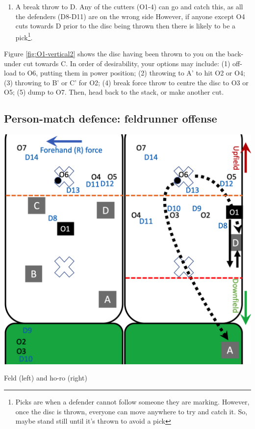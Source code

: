 \documentclass{tufte-handout}
\begin{document}
\begin{enumerate}
\item A break throw to D. 
Any of the cutters 
(O1-4)
can go and catch this, 
as all the defenders 
(D8-D11) 
are on the wrong side
However,
if anyone 
except O4 
cuts towards D 
prior to the disc being thrown 
then there is likely 
to be a pick\footnote{
Picks are
when a defender 
cannot follow 
someone they are marking.  
However, 
once the disc is thrown,
everyone can move anywhere 
to try and catch it. 
So, maybe stand still 
until it's thrown 
to avoid a pick}.
\end{enumerate}

Figure \ref{fig:O1-vertical2} shows 
the disc having been thrown to you
on the back-under cut towards C. 
In order of desirability, 
your options may include: 
(1)
off-load to O6, 
putting them in power position;
(2) throwing to A' to hit O2 or O4;
(3) throwing to B' or C' for O2;
(4) break force throw 
to centre the disc
to O3 or O5;
(5) dump to O7.
Then, head back to the stack, 
or make another cut.



\subsection{Person-match defence: feldrunner offense}
\label{sec:feld}

\begin{marginfigure}%
  \includegraphics[width=\linewidth]{O1-horizontal}
  \caption{Feld (left) and ho-ro (right)}
  \label{fig:O1-horizontal}
\end{marginfigure}
\end{document}
